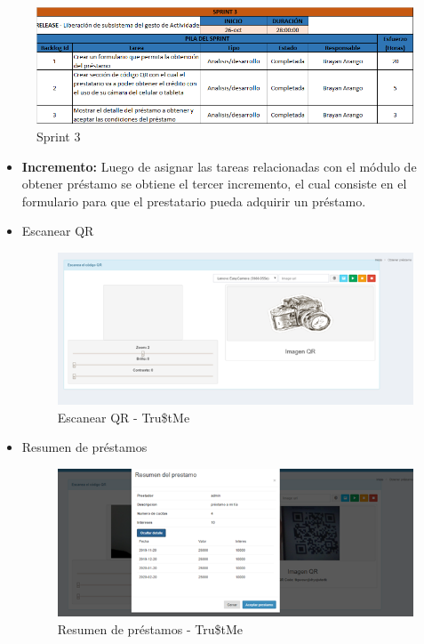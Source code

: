 {{			\begin{figure}[H]
				\centering
				\includegraphics[width=1\linewidth]{development/sprint3.png}
				\caption{Sprint 3}
			\end{figure}
			
			\begin{itemize}
				
				\item \textbf{Incremento:} Luego de asignar las tareas relacionadas con el módulo de obtener préstamo se obtiene el tercer incremento, el cual consiste en el formulario para que el prestatario pueda adquirir un préstamo.
				
				
				\item Escanear QR
				\begin{figure}[H]
					\centering
					\includegraphics[width=1\linewidth]{development/escanearqr.png}
					\caption{Escanear QR - Tru\$tMe}
				\end{figure}
				
				\item Resumen de préstamos
				\begin{figure}[H]
					\centering
					\includegraphics[width=1\linewidth]{development/resumenprestamos.png}
					\caption{Resumen de préstamos - Tru\$tMe}
				\end{figure}
	
				
			\end{itemize}
			
			
			
		}

}
	


